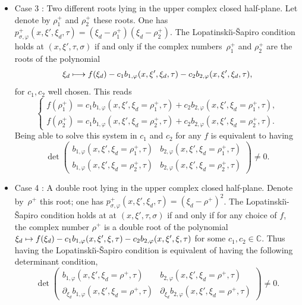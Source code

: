 \documentclass[JEP,XML,SOM,Unicode,published]{cedram}
\newcommand\mto{\mathchoice{\longmapsto}{\mapsto}{\mapsto}{\mapsto}}
\theoremstyle{plain}
\theoremstyle{definition}
\def\C{\mathbb{C}}
\newcommand{\LS}{Lopatinski\u{\i}-\v{S}apiro\xspace}
\newcommand{\pconj}{p_{\sigma,\varphi}}
\begin{document}
\begin{itemize}
\item
Case 3 : Two different roots lying in the upper complex
closed half-plane. Let denote by $\rho^+_1$ and $\rho^+_2$ these
roots. One has
$\pconj^+ (x,\xi',\xi_d,\tau)=(\xi_d-\rho^+_1)(\xi_d-\rho^+_2)$.
The \LS condition holds at $(x,\xi',\tau,\sigma)$ if and only
if the complex numbers~$\rho^+_1$ and $\rho^+_2$ are the roots of
the polynomial\vspace*{-3pt}
\[
\xi_d\mto
f(\xi_d)-c_1b_{1,\varphi}(x,\xi',\xi_d,\tau)-c_2b_{2,\varphi}(x,\xi',\xi_d,\tau),
\]
for $c_1,c_2$ well chosen. This reads\vspace*{-3pt}
\begin{equation*}
\begin{cases}
f(\rho^+_1)= c_1b_{1,\varphi}(x,\xi',\xi_d=\rho^+_1,\tau)+c_2b_{2,\varphi}(x,\xi',\xi_d=\rho^+_1,\tau),\\
f(\rho^+_2)= c_1b_{1,\varphi}(x,\xi',\xi_d=\rho^+_2,\tau)+c_2b_{2,\varphi}(x,\xi',\xi_d=\rho^+_2,\tau).
\end{cases}
\end{equation*}
Being able to solve this system in $c_1$ and $c_2$ for any $f$ is equivalent to having
\begin{equation}\label{kan1}
\det
\begin{pmatrix}
b_{1,\varphi}(x,\xi',\xi_d=\rho^+_1,\tau) & b_{2,\varphi}(x,\xi',\xi_d=\rho^+_1,\tau) \\[
4pt]
b_{1,\varphi}(x,\xi',\xi_d=\rho^+_2,\tau) & b_{2,\varphi}(x,\xi',\xi_d=\rho^+_2,\tau)
\end{pmatrix}\neq 0.
\end{equation}

\item
Case 4 : A double root lying in the upper complex closed
half-plane. Denote by~$\rho^+$ this root; one has
$\pconj^+(x,\xi',\xi_d,\tau)=(\xi_d-\rho^+)^2$. The
\LS condition holds at at $(x,\xi',\tau,\sigma)$ if and only if for any choice of $f$, the
complex number $\rho^+$ is a double root of the polynomial
$\xi_d\mto f(\xi_d)-c_1
b_{1,\varphi}(x,\xi',\xi,\tau)-c_2b_{2,\varphi}(x,\xi',\xi,\tau)$
for some $c_1,c_2\in\C$. Thus having the
\LS condition is equivalent of having the following
determinant condition,\vspace*{-3pt}
\begin{equation}\label{kkan1}
\det
\begin{pmatrix}
b_{1,\varphi}(x,\xi',\xi_d=\rho^+,\tau) & b_{2,\varphi}(x,\xi',\xi_d=\rho^+,\tau) \\[
4pt]
\partial_{\xi_d}b_{1,\varphi}(x,\xi',\xi_d=\rho^+,\tau) & \partial_{\xi_d}b_{2,\varphi}(x,\xi',\xi_d=\rho^+,\tau)
\end{pmatrix}\neq 0.
\end{equation}
\end{itemize}
\end{document}
